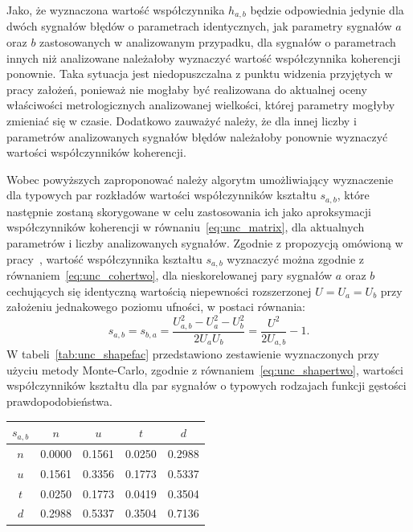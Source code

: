 Jako, że wyznaczona wartość współczynnika $h_{a,b}$ będzie odpowiednia jedynie dla dwóch sygnałów błędów o parametrach identycznych, jak parametry sygnałów $a$ oraz $b$ zastosowanych w analizowanym przypadku, dla sygnałów o parametrach innych niż analizowane należałoby wyznaczyć wartość współczynnika koherencji ponownie. Taka sytuacja jest niedopuszczalna z punktu widzenia przyjętych w pracy założeń, ponieważ nie mogłaby być realizowana do aktualnej oceny właściwości metrologicznych analizowanej wielkości, której parametry mogłyby zmieniać się w czasie. Dodatkowo zauważyć należy, że dla innej liczby i parametrów analizowanych sygnałów błędów należałoby ponownie wyznaczyć wartości współczynników koherencji.

Wobec powyższych zaproponować należy algorytm umożliwiający wyznaczenie dla typowych par rozkładów wartości współczynników kształtu $s_{a,b}$, które następnie zostaną skorygowane w celu zastosowania ich jako aproksymacji współczynników koherencji w równaniu~\eqref{eq:unc_matrix}, dla aktualnych parametrów i liczby analizowanych sygnałów. Zgodnie z propozycją omówioną w pracy~\cite{jakubiec_model}, wartość współczynnika kształtu $s_{a,b}$ wyznaczyć można zgodnie z równaniem~\eqref{eq:unc_cohertwo}, dla nieskorelowanej pary sygnałów $a$ oraz $b$ cechujących się identyczną wartością niepewności rozszerzonej $U = U_{a} = U_{b}$ przy założeniu jednakowego poziomu ufności, w postaci równania:
\begin{equation}
s_{a,b} = s_{b,a} = \frac{U_{a,b}^{2} - U_{a}^{2} - U_{b}^{2}}{2 U_{a} U_{b}} = \frac{U^{2}}{2 U_{a,b}} - 1 \label{eq:unc_shapertwo}.
\end{equation}
W tabeli~\ref{tab:unc_shapefac} przedstawiono zestawienie wyznaczonych przy użyciu metody Monte-Carlo, zgodnie z równaniem~\eqref{eq:unc_shapertwo}, wartości współczynników kształtu dla par sygnałów o typowych rodzajach funkcji gęstości prawdopodobieństwa.

\begin{table}[htb!]
\begin{center}
\begin{tabular}[c]{| c | S[table-format = 1.4] | S[table-format = 1.4] | S[table-format = 1.4] | S[table-format = 1.4] |} \hline
$s_{a,b}$ & \textbf{$n$} & \textbf{$u$} & \textbf{$t$} & \textbf{$d$} \\ \hline
$n$       & 0.0000       & 0.1561       & 0.0250       & 0.2988       \\ \hline
$u$       & 0.1561       & 0.3356       & 0.1773       & 0.5337       \\ \hline
$t$       & 0.0250       & 0.1773       & 0.0419       & 0.3504       \\ \hline
$d$       & 0.2988       & 0.5337       & 0.3504       & 0.7136       \\ \hline
\end{tabular}
\end{center}
\end{table}

